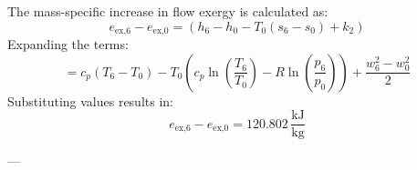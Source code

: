 The mass-specific increase in flow exergy is calculated as:  
\[
e_{\text{ex,6}} - e_{\text{ex,0}} = (h_6 - h_0 - T_0(s_6 - s_0) + k_2)
\]  
Expanding the terms:  
\[
= c_p(T_6 - T_0) - T_0 \left( c_p \ln \left( \frac{T_6}{T_0} \right) - R \ln \left( \frac{p_6}{p_0} \right) \right) + \frac{w_6^2 - w_0^2}{2}
\]  
Substituting values results in:  
\[
e_{\text{ex,6}} - e_{\text{ex,0}} = 120.802 \, \frac{\text{kJ}}{\text{kg}}
\]  

---